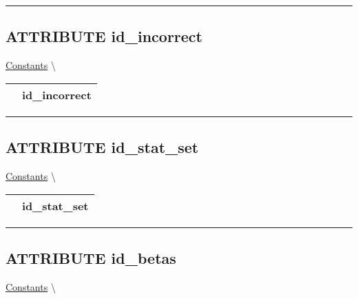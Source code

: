 \par


\rule{\linewidth}{0.5pt}
\subsection*{\textsf{\colorbox{headtoc}{\color{white} ATTRIBUTE}
id\_incorrect}}

\hypertarget{ecldoc:logisticregression.constants.id_incorrect}{}
\hspace{0pt} \hyperlink{ecldoc:LogisticRegression.Constants}{Constants} \textbackslash 

{\renewcommand{\arraystretch}{1.5}
\begin{tabularx}{\textwidth}{|>{\raggedright\arraybackslash}l|X|}
\hline
\hspace{0pt}\mytexttt{\color{red} } & \textbf{id\_incorrect} \\
\hline
\end{tabularx}
}

\par


\rule{\linewidth}{0.5pt}
\subsection*{\textsf{\colorbox{headtoc}{\color{white} ATTRIBUTE}
id\_stat\_set}}

\hypertarget{ecldoc:logisticregression.constants.id_stat_set}{}
\hspace{0pt} \hyperlink{ecldoc:LogisticRegression.Constants}{Constants} \textbackslash 

{\renewcommand{\arraystretch}{1.5}
\begin{tabularx}{\textwidth}{|>{\raggedright\arraybackslash}l|X|}
\hline
\hspace{0pt}\mytexttt{\color{red} } & \textbf{id\_stat\_set} \\
\hline
\end{tabularx}
}

\par


\rule{\linewidth}{0.5pt}
\subsection*{\textsf{\colorbox{headtoc}{\color{white} ATTRIBUTE}
id\_betas}}

\hypertarget{ecldoc:logisticregression.constants.id_betas}{}
\hspace{0pt} \hyperlink{ecldoc:LogisticRegression.Constants}{Constants} \textbackslash 

